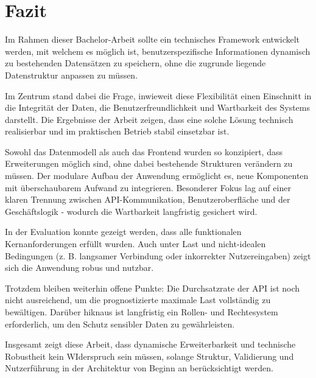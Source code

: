 \section{Fazit}
Im Rahmen dieser Bachelor-Arbeit sollte ein technisches Framework entwickelt werden, mit welchem es möglich ist, benutzerspezifische Informationen 
dynamisch zu bestehenden Datensätzen zu speichern, ohne die zugrunde liegende Datenstruktur anpassen zu müssen.

Im Zentrum stand dabei die Frage, inwieweit diese Flexibilität einen Einschnitt in die Integrität der Daten, die Benutzerfreundlichkeit und Wartbarkeit 
des Systems darstellt. Die Ergebnisse der Arbeit zeigen, dass eine solche Lösung technisch realisierbar und im praktischen Betrieb stabil einsetzbar ist.

Sowohl das Datenmodell als auch das Frontend wurden so konzipiert, dass Erweiterungen möglich sind, ohne dabei bestehende Strukturen verändern zu müssen.
Der modulare Aufbau der Anwendung ermöglicht es, neue Komponenten mit überschaubarem Aufwand zu integrieren.
Besonderer Fokus lag auf einer klaren Trennung zwischen API-Kommunikation, Benutzeroberfläche und der Geschäftslogik - wodurch die Wartbarkeit 
langfristig gesichert wird. 

In der Evaluation konnte gezeigt werden, dass alle funktionalen Kernanforderungen erfüllt wurden. 
Auch unter Last und nicht-idealen Bedingungen (z. B. langsamer Verbindung oder inkorrekter Nutzereingaben) zeigt sich die Anwendung robus und nutzbar.

Trotzdem bleiben weiterhin offene Punkte: Die Durchsatzrate der API ist noch nicht ausreichend, um die prognostizierte maximale Last vollständig zu bewältigen.
Darüber hiknaus ist langfristig ein Rollen- und Rechtesystem erforderlich, um den Schutz sensibler Daten zu gewährleisten.

Insgesamt zeigt diese Arbeit, dass dynamische Erweiterbarkeit und technische Robustheit kein WIderspruch sein müssen, solange Struktur, Validierung und Nutzerführung
in der Architektur von Beginn an berücksichtigt werden.